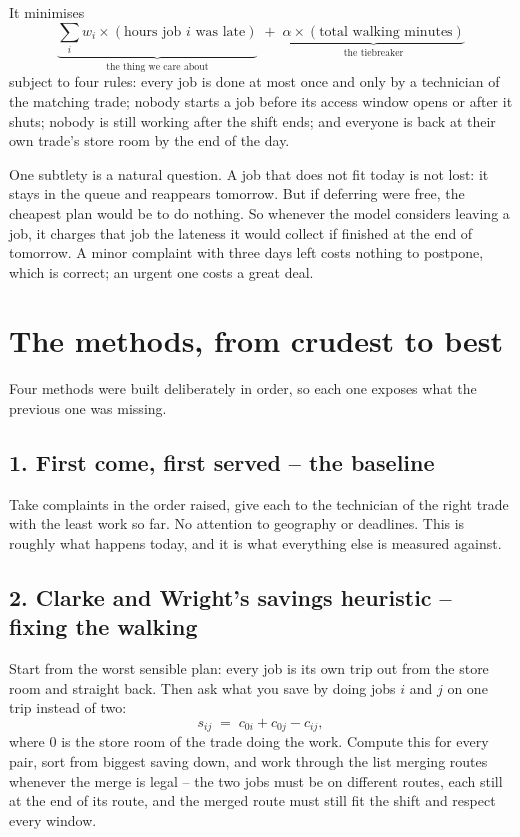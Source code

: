 \documentclass[11pt]{article}
\begin{document}
It minimises
\[
\underbrace{\sum_i w_i \times (\text{hours job } i \text{ was late})}_{\text{the thing we care about}}
\;+\;
\underbrace{\alpha \times (\text{total walking minutes})}_{\text{the tiebreaker}}
\]
subject to four rules: every job is done at most once and only by a
technician of the matching trade; nobody starts a job before its access
window opens or after it shuts; nobody is still working after the shift ends;
and everyone is back at their own trade's store room by the end of the day.

One subtlety is a natural question. A job that does not fit today is not
lost: it stays in the queue and reappears tomorrow. But if deferring were
free, the cheapest plan would be to do nothing. So whenever the model
considers leaving a job, it charges that job the lateness it would collect if
finished at the end of tomorrow. A minor complaint with three days left costs
nothing to postpone, which is correct; an urgent one costs a great deal.

\section{The methods, from crudest to best}

Four methods were built deliberately in order, so each one exposes what the
previous one was missing.

\subsection{1. First come, first served -- the baseline}
Take complaints in the order raised, give each to the technician of the right
trade with the least work so far. No attention to geography or deadlines.
This is roughly what happens today, and it is what everything else is
measured against.

\subsection{2. Clarke and Wright's savings heuristic -- fixing the walking}
Start from the worst sensible plan: every job is its own trip out from the
store room and straight back. Then ask what you save by doing jobs $i$ and
$j$ on one trip instead of two:
\[
s_{ij} \;=\; c_{0i} + c_{0j} - c_{ij},
\]
where $0$ is the store room of the trade doing the work. Compute this for
every pair, sort from biggest saving down, and work through the list merging
routes whenever the merge is legal -- the two jobs must be on different
routes, each still at the end of its route, and the merged route must still
fit the shift and respect every window.
\end{document}
